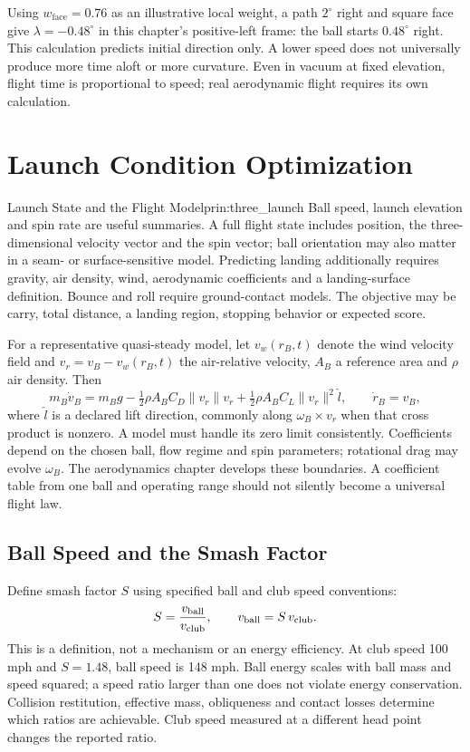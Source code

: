 Using $w_{\mathrm{face}}=0.76$ as an illustrative local weight, a path $2^\circ$
right and
square face give $\lambda=-0.48^\circ$ in this chapter's positive-left frame:
the ball starts $0.48^\circ$ right. This calculation predicts initial direction
only. A lower speed does not universally produce more time aloft or more
curvature. Even in vacuum at fixed elevation, flight time is proportional
to speed; real aerodynamic flight requires its own calculation.

\section{Launch Condition Optimization}
\label{sec:launch_optimization}

\begin{principle}{Launch State and the Flight Model}{prin:three_launch}
Ball speed, launch elevation and spin rate are useful summaries. A full
flight state includes position, the three-dimensional velocity vector and
the spin vector; ball orientation may also matter in a seam- or
surface-sensitive model. Predicting landing additionally requires gravity,
air density, wind, aerodynamic coefficients and a landing-surface definition.
Bounce and roll require ground-contact models. The objective may be carry,
total distance, a landing region, stopping behavior or expected score.
\end{principle}

For a representative quasi-steady model, let $v_w(r_B,t)$ denote the wind
velocity field and $v_r=v_B-v_w(r_B,t)$ the air-relative
velocity, $A_B$ a reference area and $\rho$ air density. Then
\[
m_B\dot v_B=m_Bg-\tfrac12\rho A_B C_D\|v_r\|v_r
+\tfrac12\rho A_B C_L\|v_r\|^2\hat l,
\qquad \dot r_B=v_B,
\]
where $\hat l$ is a declared lift direction, commonly along
$\omega_B\times v_r$ when that cross product is nonzero. A model must handle
its zero limit consistently. Coefficients depend on the chosen ball, flow
regime and spin parameters; rotational drag may evolve $\omega_B$. The
aerodynamics chapter develops these boundaries. A coefficient table from one
ball and operating range should not silently become a universal flight law.

\subsection{Ball Speed and the Smash Factor}

Define smash factor $S$ using specified ball and club speed conventions:
\begin{equation}
S=\frac{v_{\rm ball}}{v_{\rm club}},\qquad
v_{\rm ball}=S\,v_{\rm club}.
\label{eq:smash}
\end{equation}
This is a definition, not a mechanism or an energy efficiency. At club speed
100 mph and $S=1.48$, ball speed is 148 mph. Ball energy scales with ball
mass and speed squared; a speed ratio larger than one does not violate energy
conservation. Collision restitution, effective mass, obliqueness and contact
losses determine which ratios are achievable. Club speed measured at a
different head point changes the reported ratio.

